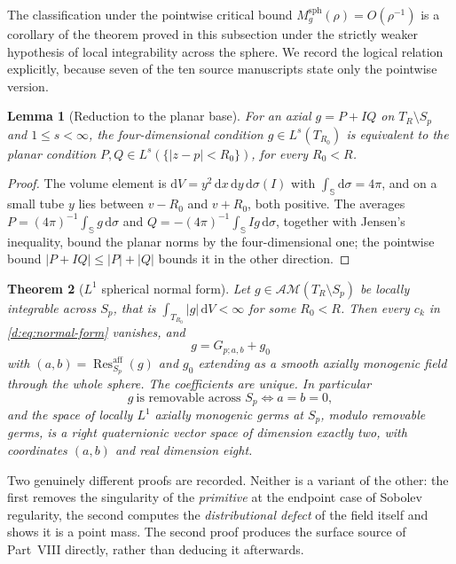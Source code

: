 \documentclass[11pt,a4paper]{article}
\numberwithin{equation}{section}
\newtheorem{theorem}{Theorem}[section]
\newtheorem{lemma}[theorem]{Lemma}
\theoremstyle{definition}
\theoremstyle{remark}
\theoremstyle{plain}
\newcommand{\SSS}{\mathbb S}
\newcommand{\AM}{\mathcal{AM}}
\newcommand{\Sp}{S_{p}}
\newcommand{\Msph}{M^{\mathrm{sph}}}                  %
\newcommand{\Tube}{T}
\newcommand{\abs}[1]{\lvert #1\rvert}
\newcommand{\dd}{\mathrm d}
\newcommand{\Resaff}{\operatorname{Res}^{\mathrm{aff}}}
\begin{document}
The classification under the pointwise critical bound
$\Msph_g(\rho)=O(\rho^{-1})$ is a corollary of the theorem proved in this
subsection under the strictly weaker hypothesis of local integrability
across the sphere.  We record the logical relation explicitly, because
seven of the ten source manuscripts state only the pointwise version.

\begin{lemma}[Reduction to the planar base]
\label{d:lem:reduction}
For an axial $g=P+IQ$ on $\Tube_R\setminus\Sp$ and $1\le s<\infty$, the
four-dimensional condition $g\in L^s(\Tube_{R_0})$ is equivalent to the
planar condition $P,Q\in L^s(\{\abs{z-p}<R_0\})$, for every $R_0<R$.
\end{lemma}

\begin{proof}
The volume element is $\dd V=y^2\,\dd x\,\dd y\,\dd\sigma(I)$ with
$\int_{\SSS}\dd\sigma=4\pi$, and on a small tube $y$ lies between $v-R_0$
and $v+R_0$, both positive.  The averages
$P=(4\pi)^{-1}\int_{\SSS}g\,\dd\sigma$ and
$Q=-(4\pi)^{-1}\int_{\SSS}Ig\,\dd\sigma$, together with Jensen's
inequality, bound the planar norms by the four-dimensional one; the
pointwise bound $\abs{P+IQ}\le\abs P+\abs Q$ bounds it in the other
direction.
\end{proof}

\begin{theorem}[$L^1$ spherical normal form]
\label{d:thm:L1}
Let $g\in\AM(\Tube_R\setminus\Sp)$ be locally integrable across $\Sp$, that
is $\int_{\Tube_{R_0}}\abs{g}\,\dd V<\infty$ for some $R_0<R$.  Then every
$c_k$ in \eqref{d:eq:normal-form} vanishes, and
\begin{equation}
 \boxed{\ g=G_{p;a,b}+g_0\ }
 \label{d:eq:L1-normal}
\end{equation}
with $(a,b)=\Resaff_{\Sp}(g)$ and $g_0$ extending as a smooth axially
monogenic field through the whole sphere.  The coefficients are unique.  In
particular
\begin{equation}
 g\ \text{is removable across }\Sp
 \iff a=b=0,
 \label{d:eq:L1-removal}
\end{equation}
and the space of locally $L^1$ axially monogenic germs at $\Sp$, modulo
removable germs, is a right quaternionic vector space of dimension exactly
two, with coordinates $(a,b)$ and real dimension eight.
\end{theorem}

Two genuinely different proofs are recorded.  Neither is a variant of the
other: the first removes the singularity of the \emph{primitive} at the
endpoint case of Sobolev regularity, the second computes the
\emph{distributional defect} of the field itself and shows it is a point
mass.  The second proof produces the surface source of Part~VIII directly,
rather than deducing it afterwards.
\end{document}
